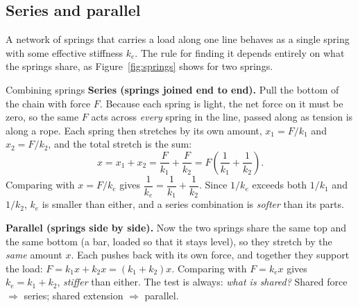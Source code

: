 \begin{figure}[htbp]
\centering
{}
\end{figure}

\subsection{Series and parallel}

A network of springs that carries a load along one line behaves as a single spring with some effective
stiffness $k_e$. The rule for finding it depends entirely on what the springs share, as Figure~\ref{fig:springs}
shows for two springs.

\begin{derivbox}{Combining springs}
\textbf{Series (springs joined end to end).} Pull the bottom of the chain with force $F$. Because each
spring is light, the net force on it must be zero, so the same $F$ acts across \emph{every} spring in the
line, passed along as tension is along a rope. Each spring then stretches by its own amount,
$x_1=F/k_1$ and $x_2=F/k_2$, and the total stretch is the sum:
\[
x=x_1+x_2=\frac{F}{k_1}+\frac{F}{k_2}=F\left(\frac{1}{k_1}+\frac{1}{k_2}\right).
\]
Comparing with $x=F/k_e$ gives $\dfrac{1}{k_e}=\dfrac{1}{k_1}+\dfrac{1}{k_2}$. Since $1/k_e$ exceeds
both $1/k_1$ and $1/k_2$, $k_e$ is smaller than either, and a series combination is \emph{softer} than
its parts.

\textbf{Parallel (springs side by side).} Now the two springs share the same top and the same bottom
(a bar, loaded so that it stays level), so they stretch by the \emph{same} amount $x$. Each pushes back with its own force, and together they support the
load: $F=k_1x+k_2x=(k_1+k_2)x$. Comparing with $F=k_e x$ gives $k_e=k_1+k_2$, \emph{stiffer} than
either. The test is always: \emph{what is shared?} Shared force $\Rightarrow$ series; shared extension
$\Rightarrow$ parallel.
\end{derivbox}

\begin{figure}[htbp]
\centering
{}
\end{figure}


